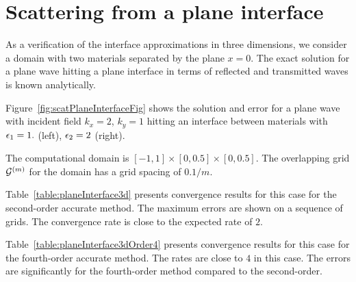 \section{Scattering from a plane interface}\label{sec:scatPlaneInterface}



As a verification of the interface approximations in three dimensions,
we consider a domain with two materials separated by the plane $x=0$.
The exact solution for a plane wave hitting a plane interface in terms of 
reflected and transmitted waves is known analytically.

Figure~\ref{fig:scatPlaneInterfaceFig} shows the solution and error for a plane wave with incident
field $k_x=2$, $k_y=1$
hitting an interface between materials with $\epsilon_1=1.$ (left), $\epsilon_2=2$ (right).

The computational domain is $[-1,1]\times[0,0.5]\times[0,0.5]$. The overlapping grid ${\mathcal G}^{(m)}$ 
for the domain has a grid spacing of $0.1/m$. 


Table~\ref{table:planeInterface3d} presents convergence results for this case for the second-order
accurate method.
The maximum errors are shown on a sequence of grids. The convergence rate is close
to the expected rate of $2$. 




Table~\ref{table:planeInterface3dOrder4} presents convergence results for this case for the fourth-order
accurate method. The rates are close to $4$ in this case. The errors are significantly
for the fourth-order method compared to the second-order.



